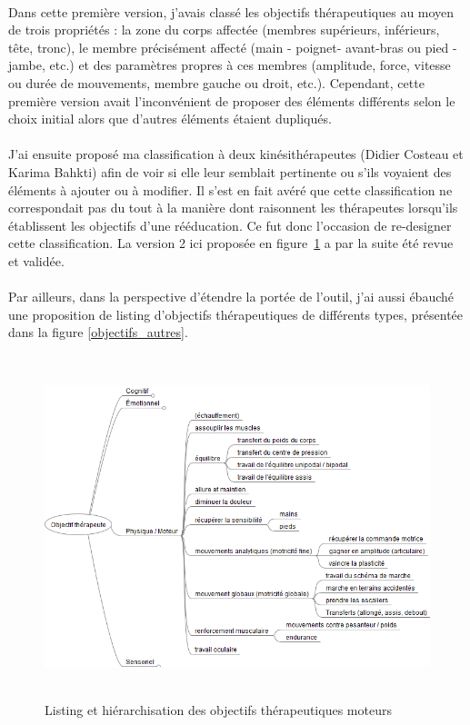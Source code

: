 \paragraph{}
Dans cette première version, j'avais classé les objectifs thérapeutiques au moyen de trois propriétés : la zone du corps affectée (membres supérieurs, inférieurs, tête, tronc), le membre précisément affecté (main - poignet- avant-bras ou pied - jambe, etc.) et des paramètres propres à ces membres (amplitude, force, vitesse ou durée de mouvements, membre gauche ou droit, etc.). Cependant, cette première version avait l'inconvénient de proposer des éléments différents selon le choix initial alors que d'autres éléments étaient dupliqués.

\paragraph{}J'ai ensuite proposé ma classification à deux kinésithérapeutes (Didier Costeau et Karima Bahkti) afin de voir si elle leur semblait pertinente ou s'ils voyaient des éléments à ajouter ou à modifier. Il s'est en fait avéré que cette classification ne correspondait pas du tout à la manière dont raisonnent les thérapeutes lorsqu'ils établissent les objectifs d'une rééducation. Ce fut donc l'occasion de re-designer cette classification. La version 2 ici proposée en figure~\ref{objectifs_moteurs} a par la suite été revue et validée.

\paragraph{}Par ailleurs, dans la perspective d'étendre la portée de l'outil, j'ai aussi ébauché une proposition de listing d'objectifs thérapeutiques de différents types, présentée dans la figure \ref{objectifs_autres}.

\begin{figure}[hbtp]
	\centering
	\includegraphics[width=16cm, height=10cm]{images/objectifs_moteurs}
	\caption{Listing et hiérarchisation des objectifs thérapeutiques moteurs}
	\label{objectifs_moteurs}
\end{figure}

